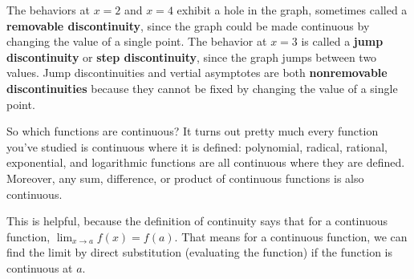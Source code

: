 The behaviors at $x=2$ and $x=4$ exhibit a hole in the graph, sometimes called a {\bf removable discontinuity}, since the graph could be made continuous by changing the value of a single point. The behavior at $x=3$ is called a {\bf jump discontinuity} or {\bf step discontinuity}, since the graph jumps between two values. Jump discontinuities and vertial asymptotes are both {\bf nonremovable discontinuities} because they cannot be fixed by changing the value of a single point.

So which functions are continuous? It turns out pretty much every function you've studied is continuous where it is defined: polynomial, radical, rational, exponential, and logarithmic functions are all continuous where they are defined. Moreover, any sum, difference, or product of continuous functions is also continuous.

This is helpful, because the definition of continuity says that for a continuous function, $\displaystyle\lim_{x\to a}f(x)=f(a)$. That means for a continuous function, we can find the limit by direct substitution (evaluating the function) if the function is continuous at $a$.

